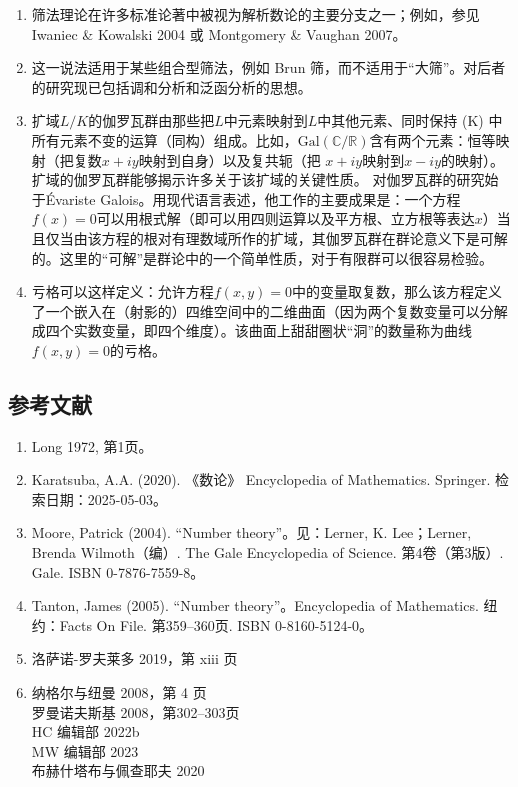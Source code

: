 \begin{enumerate}
\item 筛法理论在许多标准论著中被视为解析数论的主要分支之一；例如，参见 Iwaniec & Kowalski 2004 或 Montgomery & Vaughan 2007。
\item 这一说法适用于某些组合型筛法，例如 Brun 筛，而不适用于“大筛”。对后者的研究现已包括调和分析和泛函分析的思想。
\item 扩域$L/K$的伽罗瓦群由那些把$L$中元素映射到$L$中其他元素、同时保持 (K) 中所有元素不变的运算（同构）组成。比如，$\mathrm{Gal}(\mathbb{C}/\mathbb{R})$含有两个元素：恒等映射（把复数$x+iy$映射到自身）以及复共轭（把 $x+iy$映射到$x-iy$的映射）。扩域的伽罗瓦群能够揭示许多关于该扩域的关键性质。
对伽罗瓦群的研究始于Évariste Galois。用现代语言表述，他工作的主要成果是：一个方程$f(x) = 0$可以用根式解（即可以用四则运算以及平方根、立方根等表达$x$）当且仅当由该方程的根对有理数域所作的扩域，其伽罗瓦群在群论意义下是可解的。这里的“可解”是群论中的一个简单性质，对于有限群可以很容易检验。
\item 亏格可以这样定义：允许方程$f(x,y) = 0$中的变量取复数，那么该方程定义了一个嵌入在（射影的）四维空间中的二维曲面（因为两个复数变量可以分解成四个实数变量，即四个维度）。该曲面上甜甜圈状“洞”的数量称为曲线$f(x,y) = 0$的亏格。
\end{enumerate}
\subsection{参考文献}
\begin{enumerate}
\item Long 1972, 第1页。
\item Karatsuba, A.A. (2020). 《数论》 Encyclopedia of Mathematics. Springer. 检索日期：2025-05-03。
\item Moore, Patrick (2004). “Number theory”。见：Lerner, K. Lee；Lerner, Brenda Wilmoth（编）. The Gale Encyclopedia of Science. 第4卷（第3版）. Gale. ISBN 0-7876-7559-8。
\item Tanton, James (2005). “Number theory”。Encyclopedia of Mathematics. 纽约：Facts On File. 第359–360页. ISBN 0-8160-5124-0。
\item 洛萨诺-罗夫莱多 2019，第 xiii 页\\
\item 纳格尔与纽曼 2008，第 4 页\\
罗曼诺夫斯基 2008，第302–303页\\
HC 编辑部 2022b\\
MW 编辑部 2023\\
布赫什塔布与佩查耶夫 2020

\end{enumerate}